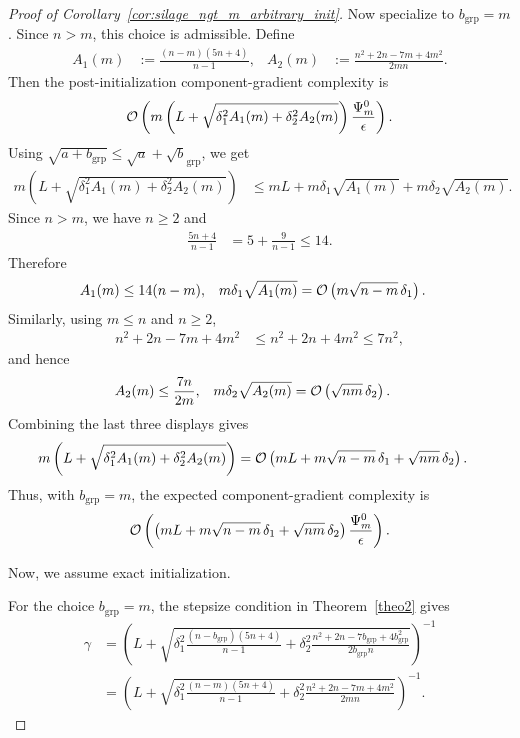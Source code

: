 \documentclass{article}
\newcommand{\cO}{{\cal O}}
\newcommand{\eqdef}{:=}
\newcommand{\rb}[1]{\left(#1\right)}
\theoremstyle{plain}
\begin{document}
\begin{proof}[Proof of Corollary~\ref{cor:silage_ngt_m_arbitrary_init}]
Now specialize to $b_{\mathrm{grp}}=m$. Since $n>m$, this choice is admissible. Define
\begin{align*}
A_1(m)
&\eqdef
\frac{(n-m)(5n+4)}{n-1},
&
A_2(m)
&\eqdef
\frac{n^2+2n-7m+4m^2}{2mn}.
\end{align*}
Then the post-initialization component-gradient complexity is
\begin{align*}
\cO\rb{
m\rb{
L+\sqrt{\delta_1^2A_1(m)+\delta_2^2A_2(m)}
}
\frac{\Psi_m^0}{\epsilon}
}.
\end{align*}
Using $\sqrt{a+b_{\mathrm{grp}}}\le \sqrt a+\sqrt b_{\mathrm{grp}}$, we get
\begin{align*}
m\rb{
L+\sqrt{\delta_1^2A_1(m)+\delta_2^2A_2(m)}
}
&\le
mL+m\delta_1\sqrt{A_1(m)}+m\delta_2\sqrt{A_2(m)}.
\end{align*}
Since $n>m$, we have $n\ge 2$ and
\begin{align*}
\frac{5n+4}{n-1}
&=
5+\frac{9}{n-1}
\le
14.
\end{align*}
Therefore
\begin{align*}
A_1(m)
&\le
14(n-m),
&
m\delta_1\sqrt{A_1(m)}
&=
\cO\rb{m\sqrt{n-m}\,\delta_1}.
\end{align*}
Similarly, using $m\le n$ and $n\ge 2$,
\begin{align*}
n^2+2n-7m+4m^2
&\le
n^2+2n+4m^2
\le
7n^2,
\end{align*}
and hence
\begin{align*}
A_2(m)
&\le
\frac{7n}{2m},
&
m\delta_2\sqrt{A_2(m)}
&=
\cO\rb{\sqrt{nm}\,\delta_2}.
\end{align*}
Combining the last three displays gives
\begin{align*}
m\rb{
L+\sqrt{\delta_1^2A_1(m)+\delta_2^2A_2(m)}
}
&=
\cO\rb{
mL+m\sqrt{n-m}\,\delta_1+\sqrt{nm}\,\delta_2
}.
\end{align*}
Thus, with $b_{\mathrm{grp}}=m$, the expected component-gradient complexity is
\begin{align*}
\cO\rb{
\rb{
mL+m\sqrt{n-m}\,\delta_1+\sqrt{nm}\,\delta_2
}
\frac{\Psi_m^0}{\epsilon}
}.
\end{align*}


Now, we assume exact initialization.


For the choice $b_{\mathrm{grp}}=m$, the stepsize condition in Theorem~\ref{theo2} gives
\begin{align*}
\gamma
&=
\rb{
L+\sqrt{
\delta_1^2\frac{(n-b_{\mathrm{grp}})(5n+4)}{n-1}
+\delta_2^2\frac{n^2+2n-7b_{\mathrm{grp}}+4b_{\mathrm{grp}}^2}{2b_{\mathrm{grp}}n}
}
}^{-1}
\\
&=
\rb{
L+\sqrt{
\delta_1^2\frac{(n-m)(5n+4)}{n-1}
+\delta_2^2\frac{n^2+2n-7m+4m^2}{2mn}
}
}^{-1}.
\end{align*}


\end{proof}
\end{document}
